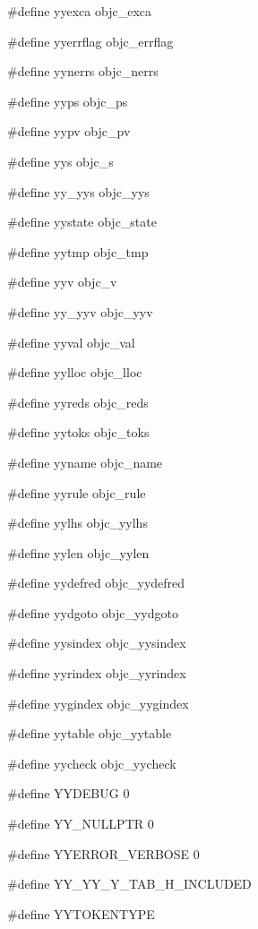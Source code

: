 \medskip
{\stt \#define yyexca objc\_exca}

\medskip
{\stt \#define yyerrflag objc\_errflag}

\medskip
{\stt \#define yynerrs objc\_nerrs}

\medskip
{\stt \#define yyps objc\_ps}

\medskip
{\stt \#define yypv objc\_pv}

\medskip
{\stt \#define yys objc\_s}

\medskip
{\stt \#define yy\_yys objc\_yys}

\medskip
{\stt \#define yystate objc\_state}

\medskip
{\stt \#define yytmp objc\_tmp}

\medskip
{\stt \#define yyv objc\_v}

\medskip
{\stt \#define yy\_yyv objc\_yyv}

\medskip
{\stt \#define yyval objc\_val}

\medskip
{\stt \#define yylloc objc\_lloc}

\medskip
{\stt \#define yyreds objc\_reds}

\medskip
{\stt \#define yytoks objc\_toks}

\medskip
{\stt \#define yyname objc\_name}

\medskip
{\stt \#define yyrule objc\_rule}

\medskip
{\stt \#define yylhs objc\_yylhs}

\medskip
{\stt \#define yylen objc\_yylen}

\medskip
{\stt \#define yydefred objc\_yydefred}

\medskip
{\stt \#define yydgoto objc\_yydgoto}

\medskip
{\stt \#define yysindex objc\_yysindex}

\medskip
{\stt \#define yyrindex objc\_yyrindex}

\medskip
{\stt \#define yygindex objc\_yygindex}

\medskip
{\stt \#define yytable objc\_yytable}

\medskip
{\stt \#define yycheck objc\_yycheck}

\medskip
{\stt \#define YYDEBUG 0}

\medskip
{\stt \#define YY\_NULLPTR 0}

\medskip
{\stt \#define YYERROR\_VERBOSE 0}

\medskip
{\stt \#define YY\_YY\_Y\_TAB\_H\_INCLUDED}

\medskip
{\stt \#define YYTOKENTYPE}

